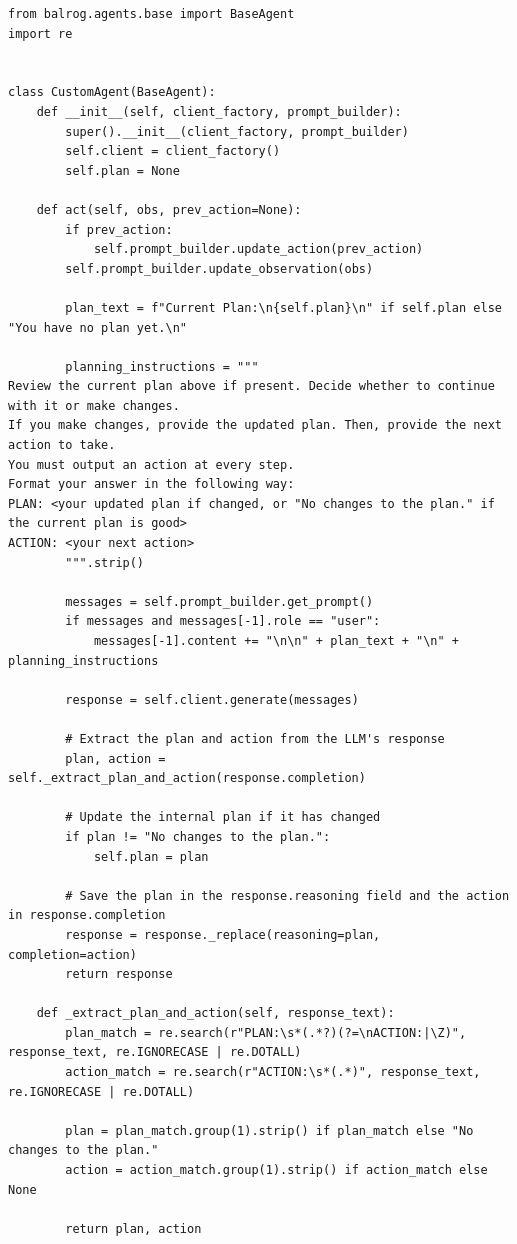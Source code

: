 \begin{listing}
\begin{verbatim}
from balrog.agents.base import BaseAgent
import re


class CustomAgent(BaseAgent):
    def __init__(self, client_factory, prompt_builder):
        super().__init__(client_factory, prompt_builder)
        self.client = client_factory()
        self.plan = None

    def act(self, obs, prev_action=None):
        if prev_action:
            self.prompt_builder.update_action(prev_action)
        self.prompt_builder.update_observation(obs)

        plan_text = f"Current Plan:\n{self.plan}\n" if self.plan else "You have no plan yet.\n"

        planning_instructions = """
Review the current plan above if present. Decide whether to continue with it or make changes.
If you make changes, provide the updated plan. Then, provide the next action to take. 
You must output an action at every step.
Format your answer in the following way:
PLAN: <your updated plan if changed, or "No changes to the plan." if the current plan is good>
ACTION: <your next action>
        """.strip()

        messages = self.prompt_builder.get_prompt()
        if messages and messages[-1].role == "user":
            messages[-1].content += "\n\n" + plan_text + "\n" + planning_instructions

        response = self.client.generate(messages)

        # Extract the plan and action from the LLM's response
        plan, action = self._extract_plan_and_action(response.completion)

        # Update the internal plan if it has changed
        if plan != "No changes to the plan.":
            self.plan = plan

        # Save the plan in the response.reasoning field and the action in response.completion
        response = response._replace(reasoning=plan, completion=action)
        return response

    def _extract_plan_and_action(self, response_text):
        plan_match = re.search(r"PLAN:\s*(.*?)(?=\nACTION:|\Z)", response_text, re.IGNORECASE | re.DOTALL)
        action_match = re.search(r"ACTION:\s*(.*)", response_text, re.IGNORECASE | re.DOTALL)

        plan = plan_match.group(1).strip() if plan_match else "No changes to the plan."
        action = action_match.group(1).strip() if action_match else None

        return plan, action
\end{verbatim}
    \caption{BALROG 中的智能体代码。}\label{lst:agent}
\end{listing}

